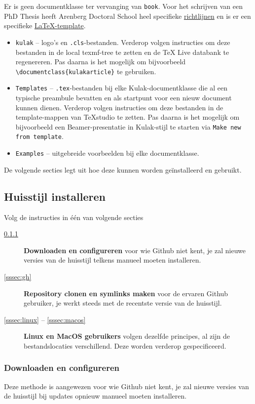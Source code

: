 \documentclass[kulak]{kulakarticle} %
\begin{document}
Er is geen documentklasse ter vervanging van \texttt{book}. Voor het schrijven van een PhD Thesis heeft Arenberg Doctoral School heel specifieke \href{https://set.kuleuven.be/intranet-associatie/ADS/guidelines_PhDthesis.htm}{richtlijnen} en is er een specifieke \href{https://people.cs.kuleuven.be/~wannes.meert/adsphd/}{\LaTeX-template}.

\begin{itemize}
\item \texttt{kulak} -- logo's en \texttt{.cls}-bestanden. Verderop volgen instructies om deze bestanden in de local texmf-tree te zetten en de TeX Live databank te regenereren. Pas daarna is het mogelijk om bijvoorbeeld \verb+\documentclass{kulakarticle}+ te gebruiken.
\item \texttt{Templates}  -- \texttt{.tex}-bestanden bij elke Kulak-documentklasse die al een typische preambule bevatten en als startpunt voor een nieuw document kunnen dienen. Verderop volgen instructies om deze bestanden in de  template-mappen van TeXstudio te zetten. Pas daarna is het mogelijk om bijvoorbeeld een Beamer-presentatie in Kulak-stijl te starten via \texttt{Make new from template}. 
\item \texttt{Examples} -- uitgebreide voorbeelden bij elke documentklasse.
\end{itemize}
De volgende secties legt uit hoe deze kunnen worden geïnstalleerd en gebruikt.

\subsection{Huisstijl installeren}
Volg de instructies in één van volgende secties
\begin{description}
\item[\ref{sssec:dl}] \textbf{Downloaden en configureren} voor wie Github niet kent, je zal nieuwe versies van de huisstijl telkens manueel moeten installeren.
\item[\ref{sssec:gh}] \textbf{Repository clonen en symlinks maken} voor de ervaren Github gebruiker, je werkt steeds met de recentste versie van de huisstijl.
\item[\ref{sssec:linux} -- \ref{sssec:macos}] \textbf{Linux en MacOS gebruikers} volgen dezelfde principes, al zijn de bestandslocaties verschillend. Deze worden verderop gespecificeerd.
\end{description}


\subsubsection{Downloaden en configureren}
\label{sssec:dl}
Deze methode is aangewezen voor wie Github niet kent, je zal nieuwe versies van de huisstijl bij updates opnieuw manueel moeten installeren.
\end{document}
